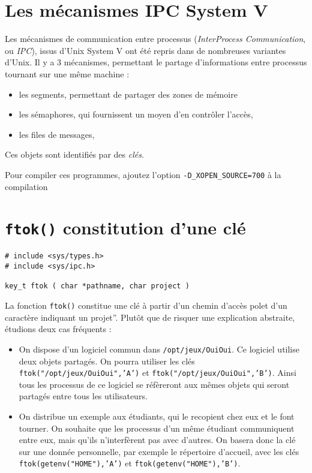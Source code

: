 
\section{Les mécanismes IPC System V}
  
  
Les mécanismes de communication entre processus (\emph{InterProcess
  Communication}, ou \emph{IPC}), issus d'Unix System V ont été repris
dans de nombreuses variantes d'Unix. Il y a 3 mécanismes, permettant
le partage d'informations entre processus tournant sur une même machine :

\begin{itemize}
\item  les segments, permettant de partager des zones de mémoire
\item  les sémaphores, qui fournissent un moyen d'en contrôler l'accès,
\item  les files de messages,
\end{itemize}


Ces  objets sont identifiés par des \emph{clés}.


Pour compiler ces programmes, ajoutez l'option
\verb+-D_XOPEN_SOURCE=700+ à la compilation

\section{\texttt{ftok()} constitution d'une clé }

\extrait
\begin{lstlisting}
# include <sys/types.h>
# include <sys/ipc.h>

key_t ftok ( char *pathname, char project )
\end{lstlisting}


La fonction \texttt{ftok()} constitue une clé à partir d'un chemin d'accès
polet d'un caractère indiquant un projet''. Plutôt que de risquer une
explication abstraite, étudions deux cas fréquents :
\begin{itemize}
\item On dispose d'un logiciel commun dans \texttt{/opt/jeux/OuiOui}. 
Ce logiciel utilise deux objets partagés. On pourra utiliser les clés
\texttt{ftok("/opt/jeux/OuiOui",'A')} et
\texttt{ftok("/opt/jeux/OuiOui",'B')}.
Ainsi tous les processus de ce logiciel se réfèreront aux mêmes objets
qui seront partagés entre tous les utilisateurs.
\item On distribue un exemple aux étudiants, qui le recopient chez eux
et le font tourner.
On souhaite que les processus d'un même étudiant communiquent entre eux,
mais qu'ils n'interfèrent pas avec d'autres. On basera donc la clé
sur une donnée personnelle, par exemple le répertoire d'accueil, avec les
clés
\texttt{ftok(getenv("HOME"),'A')} et
\texttt{ftok(getenv("HOME"),'B')}.

\end{itemize}


